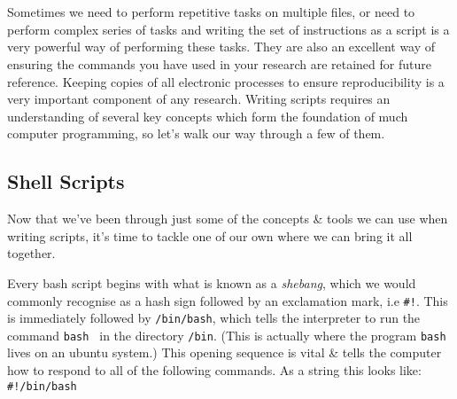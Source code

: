 
\chapter{\moduleTitle}
\newpage

Sometimes we need to perform repetitive tasks on multiple files, or need to perform complex series of tasks and writing the set of instructions as a script is a very powerful way of performing these tasks.
They are also an excellent way of ensuring the commands you have used in your research are retained for future reference.
Keeping copies of all electronic processes to ensure reproducibility is a very important component of any research. 
Writing scripts requires an understanding of several key concepts which form the foundation of much computer programming, so let's walk our way through a few of them. \\


\section{Shell Scripts}
Now that we've been through just some of the concepts \& tools we can use when writing scripts, it's time to tackle one of our own where we can bring it all together.

\begin{information}
Every bash script begins with what is known as a \textit{shebang}, which we would commonly recognise as a hash sign followed by an exclamation mark, i.e \texttt{\#!}.
This is immediately followed by \texttt{/bin/bash}, which tells the interpreter to run the command \texttt{bash } in the directory \texttt{/bin}.
(This is actually where the program \texttt{bash} lives on an ubuntu system.)
This opening sequence is vital \& tells the computer how to respond to all of the following commands.
As a string this looks like:\\

\texttt{\#!/bin/bash}\\
\end{information}

